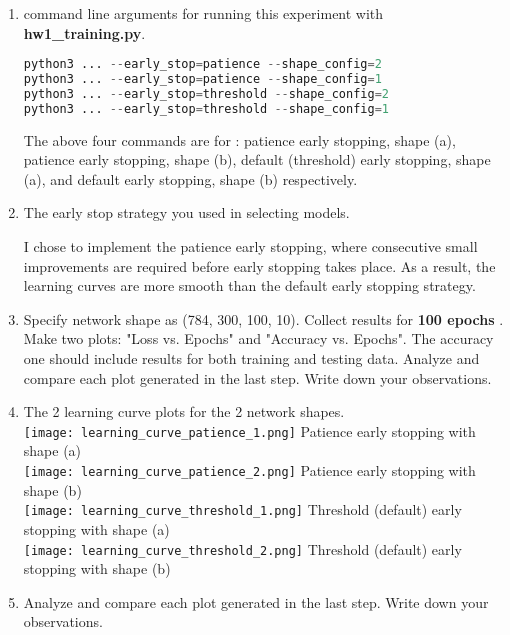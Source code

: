 \documentclass{article}
\newcommand{\homeworknumber}{1}
\begin{document}
\begin{enumerate}
  \item command line arguments for running this experiment with \textbf{hw\homeworknumber\_training.py}. \\
    \begin{lstlisting}[language = Python]
python3 ... --early_stop=patience --shape_config=2
python3 ... --early_stop=patience --shape_config=1
python3 ... --early_stop=threshold --shape_config=2
python3 ... --early_stop=threshold --shape_config=1
    \end{lstlisting}

   The above four commands are for : patience early stopping, shape (a),
   patience early stopping, shape (b), default (threshold) early stopping, shape
   (a), and default early stopping, shape (b) respectively.
   
  \item The early stop strategy you used in selecting models.

  I chose to implement the patience early stopping, where consecutive small
  improvements are required before early stopping takes place. As a result, the
  learning curves are more smooth than the default early stopping strategy.

  \item Specify network shape as (784, 300, 100, 10). Collect results for \textbf{100 epochs} .
        Make two plots: "Loss vs. Epochs" and "Accuracy vs. Epochs". The
        accuracy one should include results for both training and
        testing data. Analyze and compare each plot generated in the last step. Write down your observations.

  \item The 2 learning curve plots for the 2 network shapes.\\
        \texttt{[image: learning\_curve\_patience\_1.png]}
        Patience early stopping with shape (a)\\
        \texttt{[image: learning\_curve\_patience\_2.png]}
        Patience early stopping with shape (b)\\
        \texttt{[image: learning\_curve\_threshold\_1.png]}
        Threshold (default) early stopping with shape (a)\\
        \texttt{[image: learning\_curve\_threshold\_2.png]}
        Threshold (default) early stopping with shape (b)\\
    \item Analyze and compare each plot generated in the last step. Write down
          your observations.


\end{enumerate}
\end{document}
